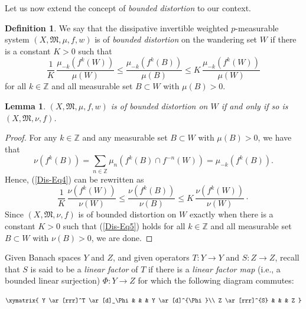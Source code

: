 \documentclass[12pt]{article}
\theoremstyle{plain}
\newtheorem{lemma}[theorem]{Lemma}%
\theoremstyle{definition}
\newtheorem{definition}[theorem]{Definition}%
\newcommand{\Z}{\mathbb{Z}} %
\newcommand{\fM}{\mathfrak{M}}
\begin{document}
Let us now extend the concept of {\em bounded distortion} \cite{AniDarMai21,UDarBPir21} to our context.

\begin{definition}\label{Dis-D3}
We say that the dissipative invertible weighted $p$-measurable system $(X,\fM,\mu,f,w)$ is of {\em bounded distortion} 
on the wandering set $W$ if there is a constant $K > 0$ such that
\begin{equation}\label{Dis-Eq4}
\frac{1}{K}\, \frac{\mu_{-k}(f^k(W))}{\mu(W)} \leq \frac{\mu_{-k}(f^k(B))}{\mu(B)} \leq K\, \frac{\mu_{-k}(f^k(W))}{\mu(W)}
\end{equation}
for all $k \in \Z$ and all measurable set $B \subset W$ with $\mu(B) > 0$. 
\end{definition}

\begin{lemma}\label{Dis-L1}
$(X,\fM,\mu,f,w)$ is of bounded distortion on $W$ if and only if so is $(X,\fM,\nu,f)$.
\end{lemma}

\begin{proof}
For any $k \in \Z$ and any measurable set $B \subset W$ with $\mu(B) > 0$, we have that
\[
\nu(f^k(B)) = \sum_{n \in \Z} \mu_n(f^k(B) \cap f^{-n}(W)) = \mu_{-k}(f^k(B)).
\]
Hence, (\ref{Dis-Eq4}) can be rewritten as
\begin{equation}\label{Dis-Eq5}
\frac{1}{K}\, \frac{\nu(f^k(W))}{\nu(W)} \leq \frac{\nu(f^k(B))}{\nu(B)} \leq K\, \frac{\nu(f^k(W))}{\nu(W)}\cdot
\end{equation}
Since $(X,\fM,\nu,f)$ is of bounded distortion on $W$ exactly when there is a constant $K > 0$ such that (\ref{Dis-Eq5}) holds
for all $k \in \Z$ and all measurable set $B \subset W$ with $\nu(B) > 0$, we are done.
\end{proof}

Given Banach spaces $Y$ and $Z$, and given operators $T : Y \to Y$ and $S : Z \to Z$, 
recall that $S$ is said to be a {\em linear factor} of $T$ if there is a {\em linear factor map} (i.e., a bounded linear surjection)
$\Phi : Y \to Z$ for which the following diagram commutes:

\[ 
 \xymatrix{
 Y
 \ar[rrr]^T
 \ar[d]_\Phi & & &
 Y
 \ar[d]^{\Phi}\\
 Z \ar[rrr]^{S} & & & Z }
\]
\end{document}
